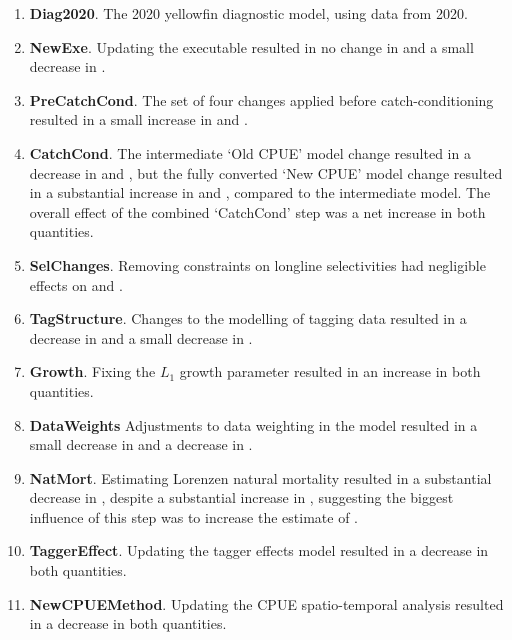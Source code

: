 \begin{enumerate}

  \item \textbf{Diag2020}. The 2020 yellowfin diagnostic model, using data from 2020.

  \item \textbf{NewExe}. Updating the executable resulted in no change in \sbsbfo and a small decrease in \sb.

  \item \textbf{PreCatchCond}. The set of four changes applied before catch-conditioning resulted in a small increase in \sbsbfo and \sb.

  \item \textbf{CatchCond}. The intermediate `Old CPUE' model change resulted in a decrease in \sbsbfo and \sb, but the fully converted `New CPUE' model change resulted in a substantial increase in \sbsbfo and \sb, compared to the intermediate model. The overall effect of the combined `CatchCond' step was a net increase in both quantities.

  \item \textbf{SelChanges}. Removing constraints on longline selectivities had negligible effects on \sbsbfo and \sb.

  \item \textbf{TagStructure}. Changes to the modelling of tagging data resulted in a decrease in \sbsbfo and a small decrease in \sb.

  \item \textbf{Growth}. Fixing the $L_1$ growth parameter resulted in an increase in both quantities.

  \item \textbf{DataWeights} Adjustments to data weighting in the model resulted in a small decrease in \sbsbfo and a decrease in \sb.

  \item \textbf{NatMort}. Estimating Lorenzen natural mortality resulted in a substantial decrease in \sbsbfo, despite a substantial increase in \sb, suggesting the biggest influence of this step was to increase the estimate of \sbfo.

  \item \textbf{TaggerEffect}. Updating the tagger effects model resulted in a decrease in both quantities.

  \item \textbf{NewCPUEMethod}. Updating the CPUE spatio-temporal analysis resulted in a decrease in both quantities.


\end{enumerate}
